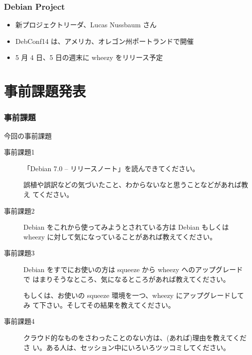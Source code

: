 \documentclass[cjk,dvipdfmx,10pt,compress,%
hyperref={bookmarks=true,bookmarksnumbered=true,bookmarksopen=false,%
colorlinks=false,%
pdftitle={第 71 回 関西 Debian 勉強会},%
pdfauthor={倉敷・のがた・佐々木・かわだ・八津尾},%
pdfsubject={資料},%
}]{beamer}
\begin{document}
\begin{frame}[fragile]
  \frametitle{Debian Project}
  \begin{itemize}
  \item 新プロジェクトリーダ、Lucas Nussbaum さん
  \item DebConf14 は、アメリカ、オレゴン州ポートランドで開催
  \item 5 月 4 日、5 日の週末に wheezy をリリース予定
  \end{itemize}
\end{frame}


\section{事前課題発表}


\begin{frame}[fragile]
  \frametitle{事前課題}
  \begin{block}{今回の事前課題}
    \begin{description}
    \item[事前課題1] 
      「Debian 7.0 -- リリースノート」を読んできてください。
      
      誤植や誤訳などの気づいたこと、わからないなと思うことなどがあれば教え
      てください。
    \item [事前課題2]%
      Debian をこれから使ってみようとされている方は Debian もしくは wheezy
      に対して気になっていることがあれば教えてください。
    \item [事前課題3]%
      Debian をすでにお使いの方は squeeze から wheezy へのアップグレードで
      はまりそうなところ、気になるところがあれば教えてください。
      
      もしくは、お使いの squeeze 環境を一つ、wheezy にアップグレードしてみ
      て下さい。そしてその結果を教えてください。
    \item [事前課題4]%
      クラウド的なものをさわったことのない方は、(あれば)理由を教えてくださ
      い。ある人は、セッション中にいろいろツッコミしてください。
    \end{description}
  \end{block}
\end{frame}

\end{document}
